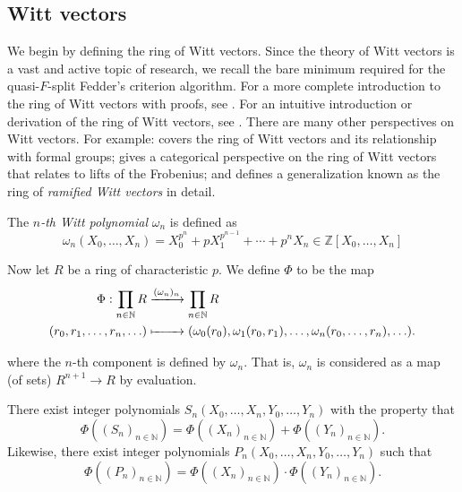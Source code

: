 
\subsection{Witt vectors}

We begin by defining the ring of Witt vectors.
Since the theory of Witt vectors is a vast and active topic of research,
we recall the bare minimum
required for the quasi-\(F\)-split Fedder's criterion algorithm.
For a more complete introduction to the ring of Witt vectors with proofs,
see \cite{rabinoff-2014-witt-vec}.
For an intuitive introduction or derivation of the ring of Witt vectors, see
\cite{kim-2017-witt-vec}.
There are many other perspectives on Witt vectors.
For example:
\cite[Chapter~17]{hazewinkel-1978-formal-groups} covers the ring of Witt vectors
and its relationship with formal groups;
\cite{kedlaya-2021-prismatic} gives a categorical perspective on the ring of Witt vectors
that relates to lifts of the Frobenius; and
\cite[Chapter~1]{schneider-2017-galois-rep-phi-gamma} defines a generalization
known as the ring of \textit{ramified Witt vectors} in detail.

\begin{defn}
	The \textit{\(n\)-th Witt polynomial} \(\omega_{n}\) is defined as
	\[
		\omega_{n}(X_{0}, \ldots, X_{n}) = X_{0}^{p^{n}} + pX_{1}^{p^{n-1}} + \cdots + p^{n}X_{n}
        \in \mathbb{Z}[X_{0}, \ldots, X_{n}]
	\]

\end{defn}

\noindent Now let \(R\) be a ring of characteristic \(p\).
We define \(\Phi\) to be the map
\begin{align*}
    \Phi : \prod_{n \in \mathbb{N}}^{} R
    &\xlongrightarrow{(\omega_{n})_{n}}
    \prod_{n \in \mathbb{N}}^{} R \\
    (r_{0}, r_{1}, \ldots, r_{n}, \ldots)
    &\xmapsto{\hphantom{(\omega_{n})_{n}}}
    (\omega_{0}(r_{0}), \omega_{1}(r_{0}, r_{1}),
    \ldots, \omega_{n}(r_{0}, \ldots, r_{n}), \ldots).
\end{align*}

where the \(n\)-th component is defined by \(\omega_{n}\).
That is, \(\omega_{n}\) is considered as a
map (of sets) \(R^{n + 1} \xrightarrow{} R\) by
evaluation.

\begin{lem}
	There exist integer polynomials 
	\(S_n(X_{0}, \ldots, X_{n}, Y_{0}, \ldots, Y_{n})\)
	with the property that
	\[
		\Phi((S_{n})_{n \in \mathbb{N}}) =
		\Phi((X_{n})_{n \in \mathbb{N}})
		+ \Phi((Y_{n})_{n \in \mathbb{N}})
	.\]
	Likewise, there exist integer polynomials 
	\(P_{n}(X_{0}, \ldots, X_{n}, Y_{0}, \ldots, Y_{n})\)
	such that
	\[
		\Phi((P_{n})_{n \in \mathbb{N}}) =
		\Phi((X_{n})_{n \in \mathbb{N}})
		\cdot \Phi((Y_{n})_{n \in \mathbb{N}})
	.\]
\end{lem}

